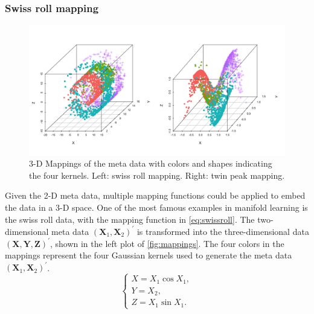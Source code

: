 \documentclass[11pt,a4paper,]{article}
\begin{document}
\hypertarget{swiss-roll-mapping}{%
\subsubsection{Swiss roll mapping}\label{swiss-roll-mapping}}

\begin{figure}

{\centering \includegraphics[width=0.8\linewidth]{figures/mappings_sr_tp} 

}

\caption{3-D Mappings of the meta data with colors and shapes indicating the four kernels. Left: swiss roll mapping. Right: twin peak mapping.}\label{fig:mappings}
\end{figure}

Given the 2-D meta data, multiple mapping functions could be applied to embed the data in a 3-D space. One of the most famous examples in manifold learning is the swiss roll data, with the mapping function in \eqref{eq:swissroll}. The two-dimensional meta data \((\pmb{X}_1, \pmb{X}_2)^\prime\) is transformed into the three-dimensional data \((\pmb{X}, \pmb{Y}, \pmb{Z})^\prime\), shown in the left plot of \autoref{fig:mappings}. The four colors in the mappings represent the four Gaussian kernels used to generate the meta data \((\pmb{X}_1, \pmb{X}_2)^\prime\).
\begin{equation}
\label{eq:swissroll}
\left\{
\begin{array}{lcl}
X = X_1 \cos{X_1}, \\
Y = X_2, \\
Z = X_1 \sin{X_1}.
\end{array}
\right.
\end{equation}
\end{document}
